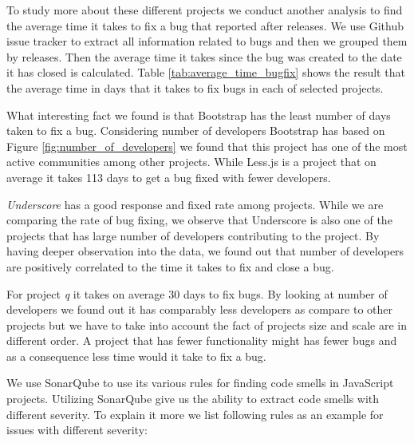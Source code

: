 To study more about these different projects we conduct another analysis to find the average time it takes to fix a bug that reported after releases. We use Github issue tracker to extract all information related to bugs and then we grouped them by releases. Then the average time it takes since the bug was created to the date it has closed is calculated. Table \ref{tab:average_time_bugfix} shows the result that the average time in days that it takes to fix bugs in each of selected projects.  
\par 
What interesting fact we found is that Bootstrap has the least number of days taken to fix a bug. Considering number of developers Bootstrap has based on Figure \ref{fig:number_of_developers} we found that this project has one of the most active communities among other projects. While Less.js is a project that on average it takes 113 days to get a bug fixed with fewer developers. 
\par
\textit{Underscore} has a good response and fixed rate among projects. While we are comparing the rate of bug fixing, we observe that Underscore is also one of the projects that has large number of developers contributing to the project. By having deeper observation into the data, we found out that number of developers are positively correlated to the time it takes to fix and close a bug.

\par For project \textit{q} it takes on average 30 days to fix bugs. By looking at number of developers we found out it has comparably less developers as compare to other projects but we have to take into account the fact of projects size and scale are in different order. A project that has fewer functionality might has fewer bugs and as a consequence less time would it take to fix a bug.

\vspace{3 mm}
\noindent{\rqiv}
\vspace{3 mm}

We use SonarQube to use its various rules for finding code smells in JavaScript projects. Utilizing SonarQube give us the ability to extract code smells with different severity. To explain it more we list following rules as an example for issues with different severity:

